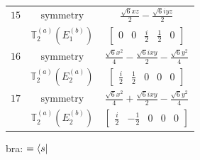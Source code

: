 \documentclass[fleqn,8pt,landscape]{jsarticle}
\begin{document}
\begin{longtable}{ccc}
$ 15 $ & $ \text{symmetry} $ & $ \frac{\sqrt{6} x z}{2} - \frac{\sqrt{6} i y z}{2} $ \\
$  $ & $ \mathbb{T}_{2}^{(a)}(E_{1}^{(b)}) $ & $ \begin{bmatrix} 0 & 0 & \frac{i}{2} & \frac{1}{2} & 0 \end{bmatrix} $ \\ \hline
$ 16 $ & $ \text{symmetry} $ & $ \frac{\sqrt{6} x^{2}}{4} - \frac{\sqrt{6} i x y}{2} - \frac{\sqrt{6} y^{2}}{4} $ \\
$  $ & $ \mathbb{T}_{2}^{(a)}(E_{2}^{(a)}) $ & $ \begin{bmatrix} \frac{i}{2} & \frac{1}{2} & 0 & 0 & 0 \end{bmatrix} $ \\ \hline
$ 17 $ & $ \text{symmetry} $ & $ \frac{\sqrt{6} x^{2}}{4} + \frac{\sqrt{6} i x y}{2} - \frac{\sqrt{6} y^{2}}{4} $ \\
$  $ & $ \mathbb{T}_{2}^{(a)}(E_{2}^{(b)}) $ & $ \begin{bmatrix} \frac{i}{2} & - \frac{1}{2} & 0 & 0 & 0 \end{bmatrix} $ \\ \hline
\end{longtable}
bra: $=\bra{s}$
\end{document}
